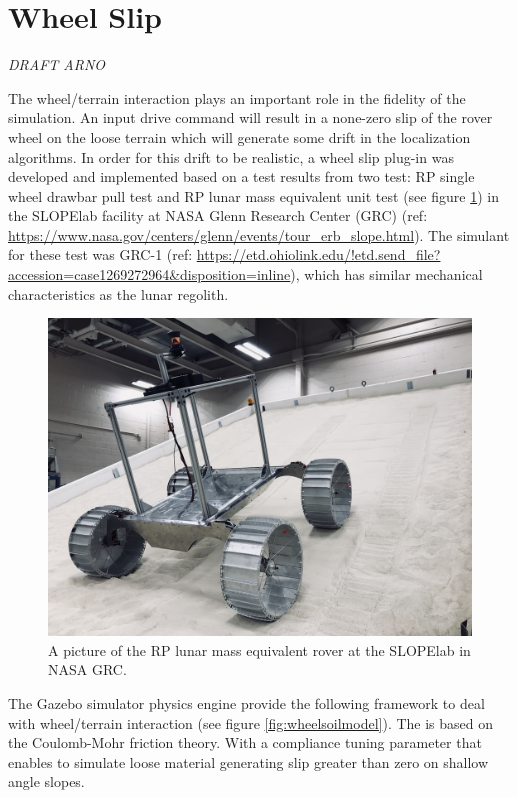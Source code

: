 \documentclass[twocolumn,letterpaper]{IEEEAerospaceCLS}  %
\begin{document}
\section{Wheel Slip}
\textit{DRAFT ARNO}

The wheel/terrain interaction plays an important role in the fidelity of the simulation. An input drive command will result in a none-zero slip of the rover wheel on the loose terrain which will generate some drift in the localization algorithms. In order for this drift to be realistic, a wheel slip plug-in was developed and implemented based on a test results from two test: RP single wheel drawbar pull test and RP lunar mass equivalent unit test (see figure \ref{fig:mgru}) in the SLOPElab facility at NASA Glenn Research Center (GRC) (ref: \url{https://www.nasa.gov/centers/glenn/events/tour_erb_slope.html}). The simulant for these test was GRC-1 (ref: \url{https://etd.ohiolink.edu/!etd.send_file?accession=case1269272964&disposition=inline}), which has similar mechanical characteristics as the lunar regolith. 
\begin{figure}[h!]
	\includegraphics[width=\columnwidth]{figures/wheel_slip_MGRU.JPG}
   	\caption{A picture of the RP lunar mass equivalent rover at the SLOPElab in NASA GRC.}
    \label{fig:mgru}
\end{figure}
The Gazebo simulator physics engine provide the following framework to deal with wheel/terrain interaction (see figure \ref{fig:wheelsoilmodel}). The is based on the Coulomb-Mohr friction theory. With a compliance tuning parameter that enables to simulate loose material generating slip greater than zero on shallow angle slopes.
\end{document}

